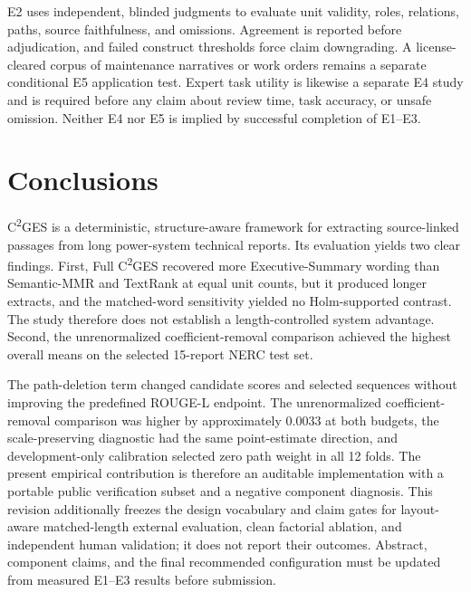 \documentclass[applsci,article,submit,moreauthors]{Definitions/mdpi}
\newcommand{\cges}{C\textsuperscript{2}GES}
\begin{document}
E2 uses independent, blinded judgments to evaluate unit validity, roles, relations, paths, source faithfulness, and omissions. Agreement is reported before adjudication, and failed construct thresholds force claim downgrading. A license-cleared corpus of maintenance narratives or work orders remains a separate conditional E5 application test. Expert task utility is likewise a separate E4 study and is required before any claim about review time, task accuracy, or unsafe omission. Neither E4 nor E5 is implied by successful completion of E1--E3.

\section{Conclusions}

\cges{} is a deterministic, structure-aware framework for extracting source-linked passages from long power-system technical reports. Its evaluation yields two clear findings. First, Full \cges{} recovered more Executive-Summary wording than Semantic-MMR and TextRank at equal unit counts, but it produced longer extracts, and the matched-word sensitivity yielded no Holm-supported contrast. The study therefore does not establish a length-controlled system advantage. Second, the unrenormalized coefficient-removal comparison achieved the highest overall means on the selected 15-report NERC test set.

The path-deletion term changed candidate scores and selected sequences without improving the predefined ROUGE-L endpoint. The unrenormalized coefficient-removal comparison was higher by approximately 0.0033 at both budgets, the scale-preserving diagnostic had the same point-estimate direction, and development-only calibration selected zero path weight in all 12 folds. The present empirical contribution is therefore an auditable implementation with a portable public verification subset and a negative component diagnosis. This revision additionally freezes the design vocabulary and claim gates for layout-aware matched-length external evaluation, clean factorial ablation, and independent human validation; it does not report their outcomes. Abstract, component claims, and the final recommended configuration must be updated from measured E1--E3 results before submission.
\end{document}
